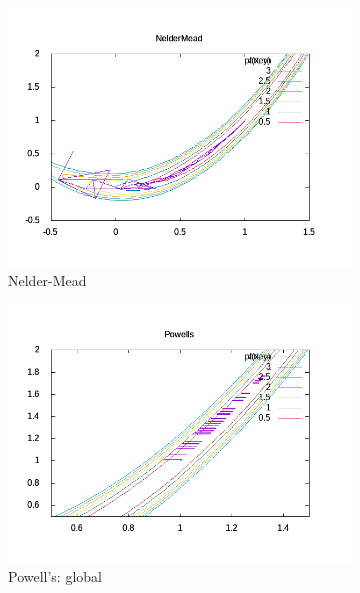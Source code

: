 \documentclass[12pt,letterpaper]{article}
\begin{document}
\begin{enumerate}
\begin{figure}
  \centering
  \begin{subfigure}[b]{0.4\textwidth}
    \centering
    \includegraphics[width=\textwidth]{figures/NelderMead_1.png}
    \caption{Nelder-Mead}
  \end{subfigure}
  \hfill
  \begin{subfigure}[b]{0.29\textwidth}
    \centering
    \includegraphics[width=\textwidth]{figures/Powells_1_1.png}
    \caption{Powell's: global}
  \end{subfigure}
  \begin{subfigure}[b]{0.29\textwidth}
    \centering

\end{subfigure}
\end{figure}
\end{enumerate}
\end{document}

